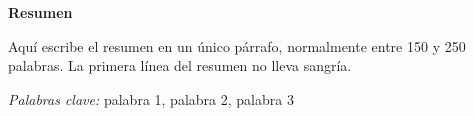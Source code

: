 \begin{center}
  \textbf{Resumen}
\end{center}

\noindent Aquí escribe el resumen en un único párrafo, normalmente entre 150 y 250 palabras. La primera línea del resumen no lleva sangría.

\par\noindent\hspace*{1.27cm}\textit{Palabras clave:} palabra 1, palabra 2, palabra 3
\clearpage
